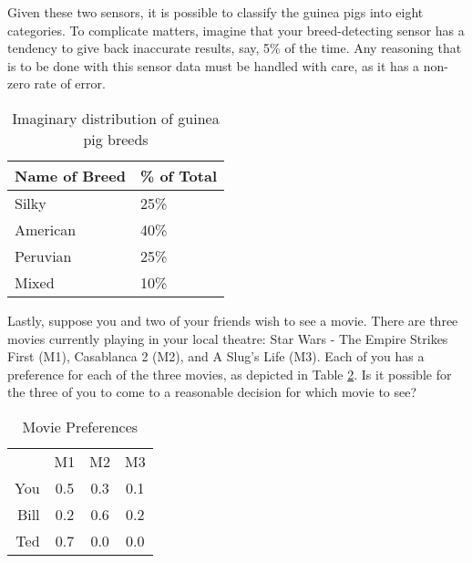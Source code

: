 \documentclass[thesis.tex]{subfiles}
\begin{document}
Given these two sensors, it is possible to classify the guinea pigs into eight categories.
To complicate matters, imagine that your breed-detecting sensor has a tendency to give back inaccurate
results, say, 5\% of the time. Any reasoning that is to be done with this sensor data must be
handled with care, as it has a non-zero rate of error.

\begin{table}
  \begin{center}
    \begin{tabular}{| l | l |}
      \hline
      Name of Breed & \% of Total \\
      \hline
      Silky         & 25\%        \\
      American      & 40\%        \\
      Peruvian      & 25\%        \\
      Mixed         & 10\%        \\
      \hline
    \end{tabular}
  \end{center}

  \caption{Imaginary distribution of guinea pig breeds}
  \label{tbl:guinea-pig-breeds}
\end{table}

Lastly, suppose you and two of your friends wish to see a movie. There are three movies currently
playing in your local theatre: Star Wars - The Empire Strikes First (M1), Casablanca 2 (M2), and
A Slug's Life (M3). Each of you has a preference for each of the three movies, as depicted in
Table \ref{tbl:movies}. Is it possible for the three of you to come to a reasonable decision for
which movie to see?

\begin{table}
  \begin{center}
    \begin{tabular}{ r|c|c|c| }
      \multicolumn{1}{r}{}
      &  \multicolumn{1}{c}{M1}
      &  \multicolumn{1}{c}{M2}
      &  \multicolumn{1}{c}{M3} \\
      \cline{2-4}
      You & 0.5 & 0.3 & 0.1 \\
      \cline{2-4}
      Bill & 0.2 & 0.6 & 0.2 \\
      \cline{2-4}
      Ted  & 0.7 & 0.0 & 0.0 \\
      \cline{2-4}
    \end{tabular}
  \end{center}

  \caption{Movie Preferences}
  \label{tbl:movies}
\end{table}
\end{document}
